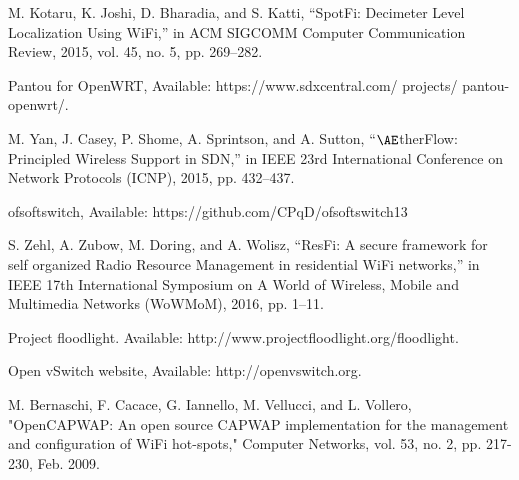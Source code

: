 \begin{thebibliography}{1}
 M. Kotaru, K. Joshi, D. Bharadia, and S. Katti, “SpotFi: Decimeter Level Localization Using WiFi,” in ACM SIGCOMM Computer Communication Review, 2015, vol. 45, no. 5, pp. 269–282.

 Pantou for OpenWRT, Available: https://www.sdxcentral.com/ projects/ pantou-openwrt/.

 M. Yan, J. Casey, P. Shome, A. Sprintson, and A. Sutton, “$\AE$therFlow: Principled Wireless Support in SDN,” in IEEE 23rd International Conference on Network Protocols (ICNP), 2015, pp. 432–437.

 ofsoftswitch, Available: https://github.com/CPqD/ofsoftswitch13

 S. Zehl, A. Zubow, M. Doring, and A. Wolisz, “ResFi: A secure framework for self organized Radio Resource Management in residential WiFi networks,” in IEEE 17th International Symposium on A World of Wireless, Mobile and Multimedia Networks (WoWMoM), 2016, pp. 1–11.



 Project floodlight. Available: http://www.projectfloodlight.org/floodlight.


 Open vSwitch website, Available: http://openvswitch.org.

 M. Bernaschi, F. Cacace, G. Iannello, M. Vellucci, and L. Vollero, "OpenCAPWAP: An open source CAPWAP implementation for the management and configuration of WiFi hot-spots," Computer Networks, vol. 53, no. 2, pp. 217-230, Feb. 2009.


\end{thebibliography}
